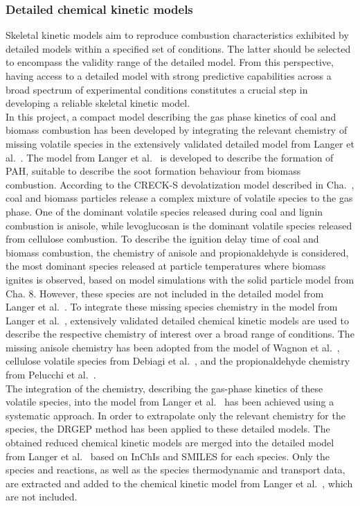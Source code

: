 \begin{refsection}
\subsubsection{Detailed chemical kinetic models}
Skeletal kinetic models aim to reproduce combustion characteristics exhibited by detailed models within a specified set of conditions. The latter should be selected to encompass the validity range of the detailed model. From this perspective, having access to a detailed model with strong predictive capabilities across a broad spectrum of experimental conditions constitutes a crucial step in developing a reliable skeletal kinetic model.
\\
In this project, a compact model describing the gas phase kinetics of coal and biomass combustion has been developed by integrating the relevant chemistry of missing volatile species in the extensively validated detailed model from Langer et al.~\cite{Langer2023}. The model from Langer et al.~\cite{Langer2023} is developed to describe the formation of PAH, suitable to describe the soot formation behaviour from biomass combustion. According to the CRECK-S devolatization model described in Cha.~, coal and biomass particles release a complex mixture of volatile species to the gas phase. One of the dominant volatile species released during coal and lignin combustion is anisole, while levoglucosan is the dominant volatile species released from cellulose combustion. To describe the ignition delay time of coal and biomass combustion, the chemistry of anisole and propionaldehyde is considered, the most dominant species released at particle temperatures where biomass ignites is observed, based on model simulations with the solid particle model from Cha. 8. However, these species are not included in the detailed model from Langer et al.~\cite{Langer2023}. To integrate these missing species chemistry in the model from Langer et al.~\cite{Langer2023}, extensively validated detailed chemical kinetic models are used to describe the respective chemistry of interest over a broad range of conditions. The missing anisole chemistry has been adopted from the model of Wagnon et al.~\cite{Wagnon2018}, cellulose volatile species from Debiagi et al.~\cite{Debiagi2016}, and the propionaldehyde chemistry from Pelucchi et al.~\cite{Pelucchi2015}.
\\
The integration of the chemistry, describing the gas-phase kinetics of these volatile species, into the model from Langer et al.~\cite{Langer2023} has been achieved using a systematic approach. In order to extrapolate only the relevant chemistry for the species, the DRGEP method has been applied to these detailed models. The obtained reduced chemical kinetic models are merged into the detailed model from Langer et al.~\cite{Langer2023} based on InChIs and SMILES for each species. Only the species and reactions, as well as the species thermodynamic and transport data, are extracted and added to the chemical kinetic model from Langer et al.~\cite{Langer2023}, which are not included.

\end{refsection}
